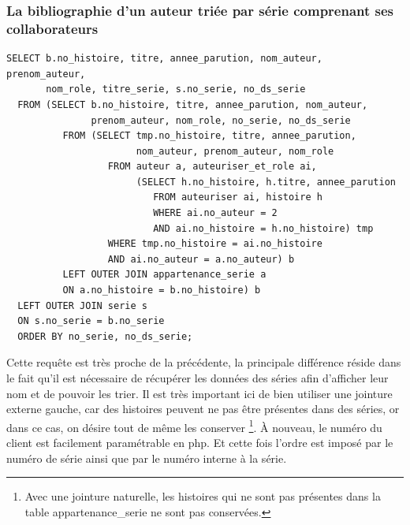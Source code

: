 \documentclass[12pt]{article}
\begin{document}
\subsubsection*{La bibliographie d'un auteur triée par série
comprenant ses collaborateurs}
\begin{lstlisting}
SELECT b.no_histoire, titre, annee_parution, nom_auteur, prenom_auteur,
       nom_role, titre_serie, s.no_serie, no_ds_serie
  FROM (SELECT b.no_histoire, titre, annee_parution, nom_auteur,
               prenom_auteur, nom_role, no_serie, no_ds_serie
          FROM (SELECT tmp.no_histoire, titre, annee_parution,
                       nom_auteur, prenom_auteur, nom_role
                  FROM auteur a, auteuriser_et_role ai,
                       (SELECT h.no_histoire, h.titre, annee_parution
                          FROM auteuriser ai, histoire h
                          WHERE ai.no_auteur = 2
                          AND ai.no_histoire = h.no_histoire) tmp
                  WHERE tmp.no_histoire = ai.no_histoire
                  AND ai.no_auteur = a.no_auteur) b
          LEFT OUTER JOIN appartenance_serie a
          ON a.no_histoire = b.no_histoire) b
  LEFT OUTER JOIN serie s
  ON s.no_serie = b.no_serie
  ORDER BY no_serie, no_ds_serie;
\end{lstlisting}
Cette requête est très proche de la précédente, la principale différence
réside dans le fait qu'il est nécessaire de récupérer les données des séries
afin d'afficher leur nom et de pouvoir les trier. Il est très important ici
de bien utiliser une jointure externe gauche, car des histoires peuvent ne
pas être présentes dans des séries, or dans ce cas, on désire tout de même
les conserver \footnote{Avec une jointure naturelle, les histoires qui ne
sont pas présentes dans la table appartenance\_serie ne sont pas
conservées.}. À nouveau, le numéro du client est facilement paramétrable en
php. Et cette fois l'ordre est imposé par le numéro de série ainsi que par le
numéro interne à la série.
\end{document}
